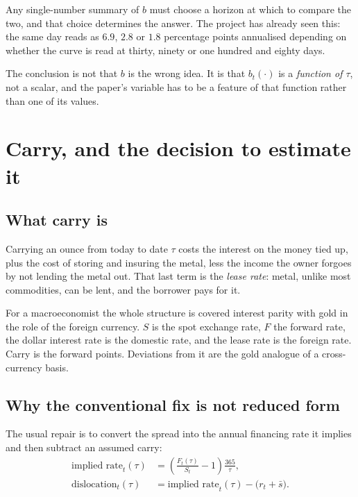 \documentclass[11pt,a4paper]{article}
\begin{document}
Any single-number summary of $b$ must choose a horizon at which to compare the
two, and that choice determines the answer. The project has already seen this:
the same day reads as $6.9$, $2.8$ or $1.8$ percentage points annualised
depending on whether the curve is read at thirty, ninety or one hundred and
eighty days.

\medskip
\noindent The conclusion is not that $b$ is the wrong idea. It is that $b_t(\cdot)$ is a
\emph{function of $\tau$}, not a scalar, and the paper's variable has to be a
feature of that function rather than one of its values.

\section{Carry, and the decision to estimate it}
\label{sec:carry}

\subsection*{What carry is}

Carrying an ounce from today to date $\tau$ costs the interest on the money
tied up, plus the cost of storing and insuring the metal, less the income the
owner forgoes by not lending the metal out. That last term is the \emph{lease
rate}: metal, unlike most commodities, can be lent, and the borrower pays for
it.

For a macroeconomist the whole structure is covered interest parity with gold
in the role of the foreign currency. $S$ is the spot exchange rate, $F$ the
forward rate, the dollar interest rate is the domestic rate, and the lease
rate is the foreign rate. Carry is the forward points. Deviations from it are
the gold analogue of a cross-currency basis.

\subsection*{Why the conventional fix is not reduced form}

The usual repair is to convert the spread into the annual financing rate it
implies and then subtract an assumed carry:
\begin{align}
\text{implied rate}_t(\tau) &= \left(\frac{F_t(\tau)}{S_t}-1\right)\frac{365}{\tau},\\
\text{dislocation}_t(\tau) &= \text{implied rate}_t(\tau) - \bigl(r_t + \bar{s}\bigr).
\end{align}
\end{document}
